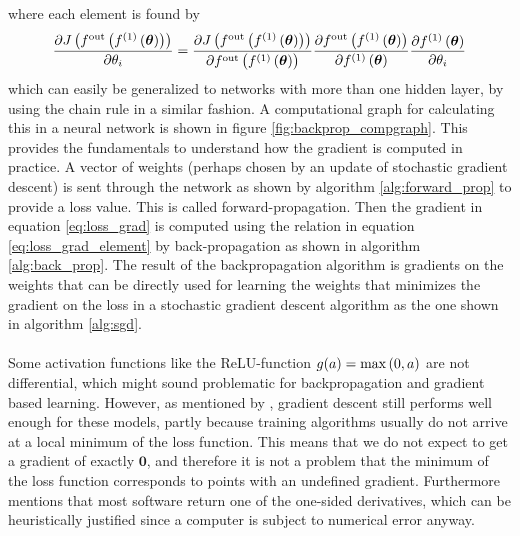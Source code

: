 where each element is found by
\begin{equation} \label{eq:loss_grad_element}
    \frac{\partial J\left (f^{\text{out}} \left (f^{(1)}\left (\boldsymbol{\theta}\right)\right)\right)}{\partial \theta_i} = \frac{\partial J\left (f^{\text{out}} \left (f^{(1)}\left (\boldsymbol{\theta}\right)\right)\right)}{\partial f^{\text{out}} \left (f^{(1)}\left (\boldsymbol{\theta}\right)\right)} 
    \frac{\partial f^{\text{out}} \left (f^{(1)}\left (\boldsymbol{\theta}\right)\right)}{\partial f^{(1)}\left (\boldsymbol{\theta}\right)} 
    \frac{\partial f^{(1)}\left (\boldsymbol{\theta}\right)}{\partial \theta_i}
\end{equation}
which can easily be generalized to networks with more than one hidden layer, by using the chain rule in a similar fashion. A computational graph for calculating this in a neural network is shown in figure \ref{fig:backprop_compgraph}. This provides the fundamentals to understand how the gradient is computed in practice. A vector of weights (perhaps chosen by an update of stochastic gradient descent) is sent through the network as shown by algorithm \ref{alg:forward_prop} to provide a loss value. This is called forward-propagation. Then the gradient in equation \ref{eq:loss_grad} is computed using the relation in equation \ref{eq:loss_grad_element} by back-propagation as shown in algorithm \ref{alg:back_prop}. The result of the backpropagation algorithm is gradients on the weights that can be directly used for learning the weights that minimizes the gradient on the loss in a stochastic gradient descent algorithm as the one shown in algorithm \ref{alg:sgd}.\\
\\
Some activation functions like the ReLU-function $g(a) = \max \left (0, a\right)$ are not differential, which might sound problematic for backpropagation and gradient based learning. However, as mentioned by \cite{Goodfellow-et-al-2016}, gradient descent still performs well enough for these models, partly because training algorithms usually do not arrive at a local minimum of the loss function. This means that we do not expect to get a gradient of exactly $\boldsymbol{0}$, and therefore it is not a problem that the minimum of the loss function corresponds to points with an undefined gradient. Furthermore \cite{Goodfellow-et-al-2016} mentions that most software return one of the one-sided derivatives, which can be heuristically justified since a computer is subject to numerical error anyway. 

